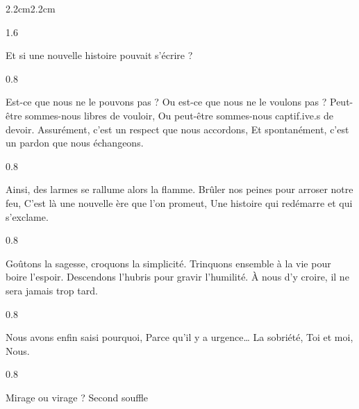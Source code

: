 \begin{adjustwidth}{2.2cm}{2.2cm}
\begin{spacing}{1.6}
~
\end{spacing}
\noindent Et si une nouvelle histoire pouvait s’écrire ?
\begin{spacing}{0.8}
~
\end{spacing}
\noindent Est-ce que nous ne le pouvons pas ?
\newline Ou est-ce que nous ne le voulons pas ?
\newline Peut-être sommes-nous libres de vouloir,
\newline Ou peut-être sommes-nous captif.ive.s de devoir.
\newline Assurément, c’est un respect que nous accordons,
\newline Et spontanément, c’est un pardon que nous échangeons.
\begin{spacing}{0.8}
~
\end{spacing}
\noindent Ainsi, des larmes se rallume alors la flamme.
\newline Brûler nos peines pour arroser notre feu,
\newline C’est là une nouvelle ère que l’on promeut,
\newline Une histoire qui redémarre et qui s’exclame.
\begin{spacing}{0.8}
~
\end{spacing}
\noindent Goûtons la sagesse, croquons la simplicité.
\newline Trinquons ensemble à la vie pour boire l’espoir.
\newline Descendons l’hubris pour gravir l’humilité.
\newline À nous d’y croire, il ne sera jamais trop tard.
\begin{spacing}{0.8}
~
\end{spacing}
\noindent Nous avons enfin saisi pourquoi,
\newline Parce qu’il y a urgence…
\newline La sobriété,
\newline Toi et moi,
\newline Nous.
\begin{spacing}{0.8}
~
\end{spacing}
\noindent Mirage ou virage ?
\newline Second souffle


\end{adjustwidth}
